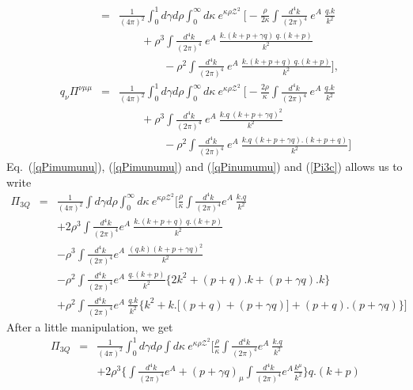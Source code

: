 \documentclass[twoside]{article}
\begin{document}
\begin{appendix}
\begin{eqnarray}
&=&
\frac{1}{(4 \pi)^2} \int_0^1 d \gamma d \rho \int_0^\infty d \kappa~ e^{\kappa \rho {\mathcal{Z}}^2}~\Big[
- \frac{\rho}{2 \kappa} \int \frac{d^4 k}{(2 \pi)^4}~e^A~ \frac{q.k}{k^2} \nonumber\\&&
\qquad
+ \rho^3 \int \frac{d^4 k}{(2 \pi)^4}~e^A~ \frac{k.(k+p+\gamma q)~q.(k+p)}{k^2} \nonumber\\&& \qquad \qquad
-\rho^2 \int \frac{d^4 k}{(2 \pi)^4}~e^A~\frac{k.(k+ p+ q)~q.(k+p)}{k^2}
\Big],\\
\label{qPinumumu}
q_\nu \Pi^{\nu \mu \mu}
&=&
\frac{1}{(4 \pi)^2} \int_0^1 d \gamma d \rho \int_0^\infty d \kappa~ e^{\kappa \rho {\mathcal{Z}}^2}~\Big[
- \frac{2 \rho}{\kappa} \int \frac{d^4 k}{(2 \pi)^4}~e^A~ \frac{q.k}{k^2} \nonumber\\&&
\qquad
+ \rho^3 \int \frac{d^4 k}{(2 \pi)^4}~e^A~ \frac{k.q~(k+p+\gamma q)^2}{k^2} \nonumber\\&& \qquad \qquad
-\rho^2 \int \frac{d^4 k}{(2 \pi)^4}~e^A~\frac{k.q~(k+p+ \gamma q).(k+p+q)}{k^2}
\Big]
\end{eqnarray}
Eq.~(\ref{qPimumunu}), (\ref{qPimunumu}) and (\ref{qPinumumu}) and (\ref{Pi3c}) allows us to write
\begin{eqnarray}
\Pi_{3Q}
&=&
\frac{1}{(4 \pi)^2} \int d \gamma d \rho \int_0^\infty d \kappa ~ e^{\kappa \rho {\mathcal{Z}}^2} \Big[
\frac{\rho}{\kappa} \int \frac{d^4 k}{(2 \pi)^4} e^A~\frac{k.q}{k^2} \nonumber\\&&
+ 2 \rho^3 \int \frac{d^4 k}{(2 \pi)^4} e^A~ \frac{k.(k+p+q)~q.(k+p)}{k^2} \nonumber\\&&
-\rho^3 \int \frac{d^4 k}{(2 \pi)^4} e^A~ \frac{(q.k)(k+p+\gamma q)^2}{k^2} \nonumber\\&&
-\rho^2 \int \frac{d^4 k}{(2 \pi)^4} e^A~\frac{q.(k+p)}{k^2} \Big\{  
2k^2 +(p+q).k + (p+\gamma q).k \Big\} \nonumber\\&&
+ \rho^2 \int \frac{d^4 k}{(2 \pi)^4} e^A~ \frac{q.k}{k^2} \Big\{
k^2 + k.\big[ (p+q)+(p+\gamma q) \big] + (p+q).(p+\gamma q)
\Big\}
\Big]
\end{eqnarray}
After a little manipulation, we get
\begin{eqnarray}
\Pi_{3Q}
&=&
\frac{1}{(4 \pi)^2} \int_0^1 d \gamma d \rho \int d \kappa~ e^{\kappa \rho {\mathcal{Z}}^2}
\Big[
\frac{\rho}{\kappa} \int \frac{d^4 k}{(2 \pi)^4} e^A~ \frac{k.q}{k^2} \nonumber\\&&
+ 2 \rho^3 \Big\{
\int \frac{d^4 k}{(2 \pi)^4} e^A + (p+ \gamma q)_\mu\int \frac{d^4 k}{(2 \pi)^4} e^A \frac{k^\mu}{k^2}
\Big\}q.(k+p) \nonumber\\&&

\end{eqnarray}
\end{appendix}
\end{document}
